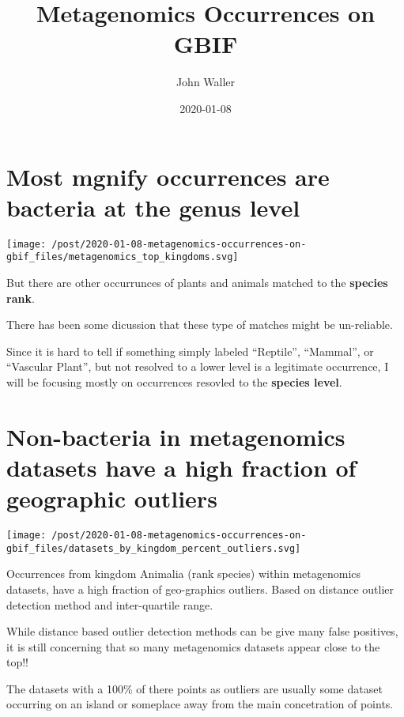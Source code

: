 \documentclass[]{article}
\title{Metagenomics Occurrences on GBIF}
\author{John Waller}
\date{2020-01-08}
\begin{document}
\maketitle

\hypertarget{most-mgnify-occurrences-are-bacteria-at-the-genus-level}{%
\section{Most mgnify occurrences are bacteria at the genus
level}\label{most-mgnify-occurrences-are-bacteria-at-the-genus-level}}

\texttt{[image: /post/2020-01-08-metagenomics-occurrences-on-gbif\_files/metagenomics\_top\_kingdoms.svg]}

But there are other occurrunces of plants and animals matched to the
\textbf{species rank}.

There has been some dicussion that these type of matches might be
un-reliable.

Since it is hard to tell if something simply labeled ``Reptile'',
``Mammal'', or ``Vascular Plant'', but not resolved to a lower level is
a legitimate occurrence, I will be focusing mostly on occurrences
resovled to the \textbf{species level}.

\hypertarget{non-bacteria-in-metagenomics-datasets-have-a-high-fraction-of-geographic-outliers}{%
\section{Non-bacteria in metagenomics datasets have a high fraction of
geographic
outliers}\label{non-bacteria-in-metagenomics-datasets-have-a-high-fraction-of-geographic-outliers}}

\texttt{[image: /post/2020-01-08-metagenomics-occurrences-on-gbif\_files/datasets\_by\_kingdom\_percent\_outliers.svg]}

Occurrences from kingdom Animalia (rank species) within metagenomics
datasets, have a high fraction of geo-graphics outliers. Based on
distance outlier detection method and inter-quartile range.

While distance based outlier detection methods can be give many false
positives, it is still concerning that so many metagenomics datasets
appear close to the top!!

The datasets with a 100\% of there points as outliers are usually some
dataset occurring on an island or someplace away from the main
concetration of points.
\end{document}

